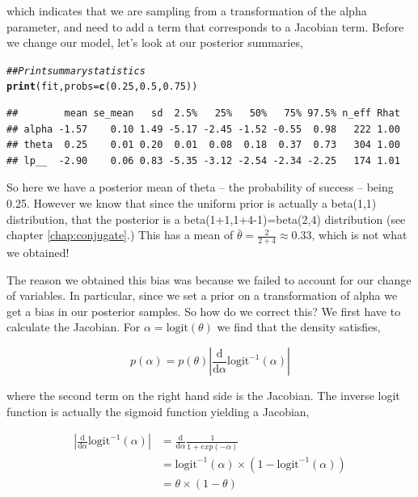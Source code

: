 \documentclass[11pt,fullpage]{book}
\makeatletter
\newenvironment{kframe}{%
	\def\at@end@of@kframe{}%
	\ifinner\ifhmode%
	\def\at@end@of@kframe{\end{minipage}}%
\begin{minipage}{\columnwidth}%
	\fi\fi%
	\def\FrameCommand##1{\hskip\@totalleftmargin \hskip-\fboxsep
		\colorbox{shadecolor}{##1}\hskip-\fboxsep
		\hskip-\linewidth \hskip-\@totalleftmargin \hskip\columnwidth}%
	\MakeFramed {\advance\hsize-\width
		\@totalleftmargin\z@ \linewidth\hsize
		\@setminipage}}%
{\par\unskip\endMakeFramed%
	\at@end@of@kframe}
\newcommand{\hlnum}[1]{\textcolor[rgb]{0.686,0.059,0.569}{#1}}%
\newcommand{\hlcom}[1]{\textcolor[rgb]{0.678,0.584,0.686}{\textit{#1}}}%
\newcommand{\hlstd}[1]{\textcolor[rgb]{0.345,0.345,0.345}{#1}}%
\newcommand{\hlkwc}[1]{\textcolor[rgb]{0.333,0.667,0.333}{#1}}%
\newcommand{\hlkwd}[1]{\textcolor[rgb]{0.737,0.353,0.396}{\textbf{#1}}}%
\newenvironment{knitrout}{}{} %
\makeatother
\begin{document}
which indicates that we are sampling from a transformation of the alpha parameter, and need to add a term that corresponds to a Jacobian term. Before we change our model, let's look at our posterior summaries,

\begin{knitrout}\small
		\color{fgcolor}\begin{kframe}
			\begin{alltt}
				\hlcom{## Print summary statistics}
				\hlkwd{print}\hlstd{(fit,}\hlkwc{probs} \hlstd{=} \hlkwd{c}\hlstd{(}\hlnum{0.25}\hlstd{,} \hlnum{0.5}\hlstd{,} \hlnum{0.75}\hlstd{))}
			\end{alltt}
			\begin{verbatim}
##        mean se_mean   sd  2.5%   25%   50%   75% 97.5% n_eff Rhat
## alpha -1.57    0.10 1.49 -5.17 -2.45 -1.52 -0.55  0.98   222 1.00
## theta  0.25    0.01 0.20  0.01  0.08  0.18  0.37  0.73   304 1.00
## lp__  -2.90    0.06 0.83 -5.35 -3.12 -2.54 -2.34 -2.25   174 1.01
			\end{verbatim}
		\end{kframe}
	\end{knitrout}

So here we have a posterior mean of theta -- the probability of success -- being 0.25. However we know that since the uniform prior is actually a beta(1,1) distribution, that the posterior is a beta(1+1,1+4-1)=beta(2,4) distribution (see chapter \ref{chap:conjugate}.) This has a mean of $\bar{\theta} =\frac{2}{2+4} \approx 0.33$, which is not what we obtained! 

The reason we obtained this bias was because we failed to account for our change of variables. In particular, since we set a prior on a transformation of alpha we get a bias in our posterior samples. So how do we correct this? We first have to calculate the Jacobian. For $\alpha=\text{logit}(\theta)$ we find that the density satisfies,

\begin{equation}
p(\alpha) = p(\theta) | \frac{\mathrm{d}}{\mathrm{d}\alpha} \text{logit}^{-1}(\alpha)| 
\end{equation}

where the second term on the right hand side is the Jacobian. The inverse logit function is actually the sigmoid function yielding a Jacobian,

\begin{align}
|\frac{\mathrm{d}}{\mathrm{d}\alpha}  \text{logit}^{-1}(\alpha)| &= \frac{\mathrm{d}}{\mathrm{d}\alpha}\frac{1}{1+exp(-\alpha)}\\
&=  \text{logit}^{-1}(\alpha) \times (1-\text{logit}^{-1}(\alpha))\\
&= \theta \times (1-\theta)
\end{align}
\end{document}
